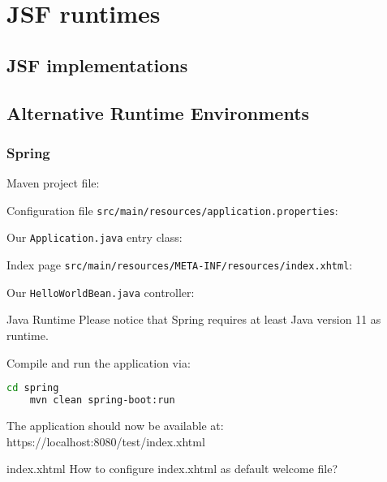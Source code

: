%

\chapter{JSF runtimes}

\section{JSF implementations}

\section{Alternative Runtime Environments}

\subsection{Spring}

Maven project file:


Configuration file \texttt{src/main/resources/application.properties}:


Our \texttt{Application.java} entry class:


Index page \texttt{src/main/resources/META-INF/resources/index.xhtml}:


Our \texttt{HelloWorldBean.java} controller:


\begin{TIP}{Java Runtime}
	Please notice that Spring requires at least Java version 11 as runtime.
\end{TIP}

Compile and run the application via:
\begin{lstlisting}[language=bash]
	cd spring
	mvn clean spring-boot:run
\end{lstlisting}
The application should now be available at:
https://localhost:8080/test/index.xhtml

\begin{TODO}{index.xhtml}
	How to configure index.xhtml as default welcome file?
\end{TODO}


